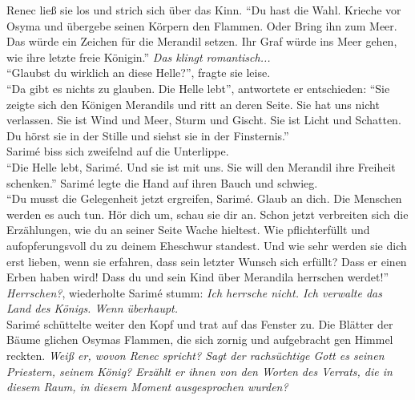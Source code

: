Renec ließ sie los und strich sich über das Kinn. ``Du hast die Wahl. Krieche vor Osyma und 
übergebe seinen Körpern den Flammen. Oder Bring ihn zum Meer. Das würde ein Zeichen für die 
Merandil setzen. Ihr Graf würde ins Meer gehen, wie ihre letzte freie Königin.''
\textit{Das klingt romantisch...}\\
``Glaubst du wirklich an diese Helle?'', fragte sie leise.\\
``Da gibt es nichts zu glauben. Die Helle lebt'', antwortete er entschieden: ``Sie zeigte sich den 
Königen Merandils und ritt an deren Seite. Sie hat uns nicht verlassen. Sie ist Wind und Meer, 
Sturm und Gischt. Sie ist Licht und Schatten. Du hörst sie in der Stille und siehst sie in der 
Finsternis.''\\
Sarimé biss sich zweifelnd auf die Unterlippe.\\
``Die Helle lebt, Sarimé. Und sie ist mit uns. Sie will den Merandil ihre Freiheit schenken.''
Sarimé legte die Hand auf ihren Bauch und schwieg.\\
``Du musst die Gelegenheit jetzt ergreifen, Sarimé. Glaub an dich. Die Menschen werden es auch tun. 
Hör dich um, schau sie dir an. Schon jetzt verbreiten sich die Erzählungen, wie du an seiner Seite 
Wache hieltest. Wie pflichterfüllt und aufopferungsvoll du zu deinem Eheschwur standest. Und wie 
sehr werden sie dich erst lieben, wenn sie erfahren, dass sein letzter Wunsch sich erfüllt? Dass er 
einen Erben haben wird! Dass du und sein Kind über Merandila herrschen werdet!''\\
\textit{Herrschen?}, wiederholte Sarimé stumm: \textit{Ich herrsche nicht. Ich verwalte das 
Land des Königs. Wenn überhaupt.}\\
Sarimé schüttelte weiter den Kopf und trat auf das Fenster zu. Die Blätter der Bäume glichen Osymas 
Flammen, die sich zornig und aufgebracht gen Himmel reckten. \textit{Weiß er, wovon Renec spricht? 
Sagt der rachsüchtige Gott es seinen Priestern, seinem König? Erzählt er ihnen von den Worten des 
Verrats, die in diesem Raum, in diesem Moment ausgesprochen wurden?}\\
